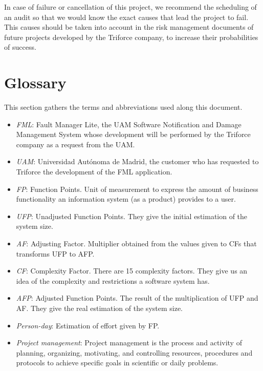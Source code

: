 \documentclass[11pt]{report}
\begin{document}
In case of failure or cancellation of this project, we recommend the scheduling of an audit so that we would know the exact causes that lead the project to fail. This causes should be taken into account in the risk management documents of future projects developed by the Triforce company, to increase their probabilities of success.
\appendix

\chapter{Glossary}
\label{chapGlossary}
This section gathers the terms and abbreviations used along this document.

\begin{itemize}
\item \emph{FML}: Fault Manager Lite, the UAM Software Notification and Damage Management System whose development will be performed by the Triforce company as a request from the UAM.

\item \emph{UAM}: Universidad Autónoma de Madrid, the customer who has requested to Triforce the development of the FML application.

\item \emph{FP}: Function Points. Unit of measurement to express the amount of business functionality an information system (as a product) provides to a user.

\item \emph{UFP}: Unadjusted Function Points. They give the initial estimation of the system size.

\item \emph{AF}: Adjusting Factor. Multiplier obtained from the values given to CFs that transforms UFP to AFP.

\item \emph{CF}: Complexity Factor. There are 15 complexity factors. They give us an idea of the complexity and restrictions a software system has.

\item \emph{AFP}: Adjusted Function Points. The result of the multiplication of UFP and AF. They give the real estimation of the system size.

\item \emph{Person-day}: Estimation of effort given by FP.

\item \emph{Project management}: Project management is the process and activity of planning, organizing, motivating, and controlling resources, procedures and protocols to achieve specific goals in scientific or daily problems.


\end{itemize}
\end{document}
